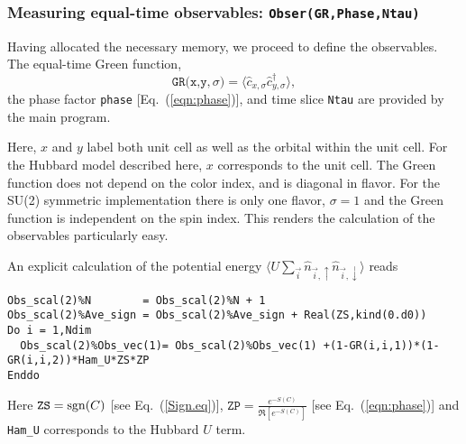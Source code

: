 \subsubsection[Measuring equal-time observables: \texttt{Obser}]{Measuring equal-time observables: \texttt{Obser(GR,Phase,Ntau)}} \label{sec:EqualTimeobs}

Having allocated the necessary memory, we proceed to define the observables. The equal-time  Green function,
\begin{equation}
	 \texttt{GR(x,y},\sigma{\texttt)}  = \langle \hat{c}^{\phantom{\dagger}}_{x,\sigma} \hat{c}^{\dagger}_{y,\sigma}  \rangle,
\end{equation}
the  phase factor \texttt{phase} [Eq.~(\ref{eqn:phase})], and time slice \texttt{Ntau}   are provided by the main program.  

Here,   $x$ and $y$ label  both unit cell as well as the orbital within the unit cell. For the Hubbard model described here, $x$ corresponds to the unit cell.  The Green function  does not depend on the color index, and is diagonal in flavor.  For the SU(2) symmetric implementation  there is only one flavor, $\sigma = 1$ and the Green function is  independent on the spin index.  This renders the calculation of the observables particularly easy.   

An explicit calculation of the   potential energy  $ \langle U \sum_{\vec{i}}  \hat{n}_{\vec{i},\uparrow}   \hat{n}_{\vec{i},\downarrow}  \rangle $ reads 
\begin{lstlisting}[style=fortran]
Obs_scal(2)%N        = Obs_scal(2)%N + 1
Obs_scal(2)%Ave_sign = Obs_scal(2)%Ave_sign + Real(ZS,kind(0.d0))
Do i = 1,Ndim
  Obs_scal(2)%Obs_vec(1)= Obs_scal(2)%Obs_vec(1) +(1-GR(i,i,1))*(1-GR(i,i,2))*Ham_U*ZS*ZP
Enddo
\end{lstlisting} 
Here  $ \texttt{ZS} = \operatorname{sgn}(C) $  [see Eq.~(\ref{Sign.eq})],  $ \texttt{ZP} =   \frac{e^{-S(C)}} {\Re \left[e^{-S(C)} \right]}   $ [see Eq.~(\ref{eqn:phase})] and  \texttt{Ham\_U}  corresponds to the Hubbard  $U$ term.

